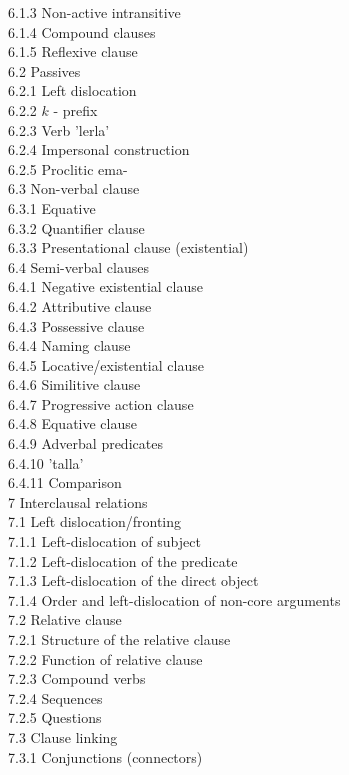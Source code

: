 \documentclass[10pt]{article}
\begin{document}
6.1.3 Non-active intransitive\\
6.1.4 Compound clauses\\
6.1.5 Reflexive clause\\
6.2 Passives\\
6.2.1 Left dislocation\\
6.2.2 \(k\) - prefix\\
6.2.3 Verb 'lerla'\\
6.2.4 Impersonal construction\\
6.2.5 Proclitic ema-\\
6.3 Non-verbal clause\\
6.3.1 Equative\\
6.3.2 Quantifier clause\\
6.3.3 Presentational clause (existential)\\
6.4 Semi-verbal clauses\\
6.4.1 Negative existential clause\\
6.4.2 Attributive clause\\
6.4.3 Possessive clause\\
6.4.4 Naming clause\\
6.4.5 Locative/existential clause\\
6.4.6 Similitive clause\\
6.4.7 Progressive action clause\\
6.4.8 Equative clause\\
6.4.9 Adverbal predicates\\
6.4.10 'talla'\\
6.4.11 Comparison\\
7 Interclausal relations\\
7.1 Left dislocation/fronting\\
7.1.1 Left-dislocation of subject\\
7.1.2 Left-dislocation of the predicate\\
7.1.3 Left-dislocation of the direct object\\
7.1.4 Order and left-dislocation of non-core arguments\\
7.2 Relative clause\\
7.2.1 Structure of the relative clause\\
7.2.2 Function of relative clause\\
7.2.3 Compound verbs\\
7.2.4 Sequences\\
7.2.5 Questions\\
7.3 Clause linking\\
7.3.1 Conjunctions (connectors)\\
\end{document}
